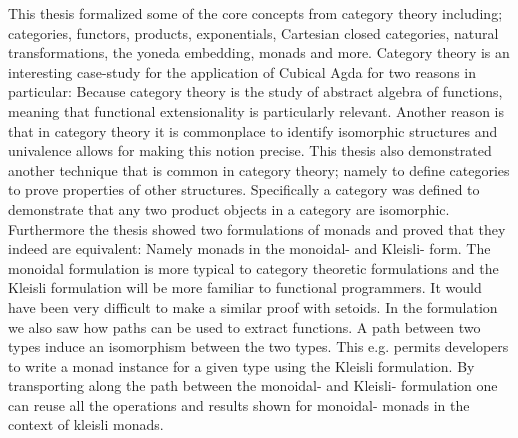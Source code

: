 This thesis formalized some of the core concepts from category theory
including; categories, functors, products, exponentials, Cartesian
closed categories, natural transformations, the yoneda embedding,
monads and more. Category theory is an interesting case-study for the
application of Cubical Agda for two reasons in particular: Because
category theory is the study of abstract algebra of functions, meaning
that functional extensionality is particularly relevant.  Another
reason is that in category theory it is commonplace to identify
isomorphic structures and univalence allows for making this notion
precise. This thesis also demonstrated another technique that is
common in category theory; namely to define categories to prove
properties of other structures.  Specifically a category was defined
to demonstrate that any two product objects in a category are
isomorphic. Furthermore the thesis showed two formulations of monads
and proved that they indeed are equivalent: Namely monads in the
monoidal- and Kleisli- form. The monoidal formulation is more typical
to category theoretic formulations and the Kleisli formulation will be
more familiar to functional programmers. It would have been very
difficult to make a similar proof with setoids. In the formulation we
also saw how paths can be used to extract functions. A path between
two types induce an isomorphism between the two types. This
e.g. permits developers to write a monad instance for a given type
using the Kleisli formulation. By transporting along the path between
the monoidal- and Kleisli- formulation one can reuse all the
operations and results shown for monoidal- monads in the context of
kleisli monads.

